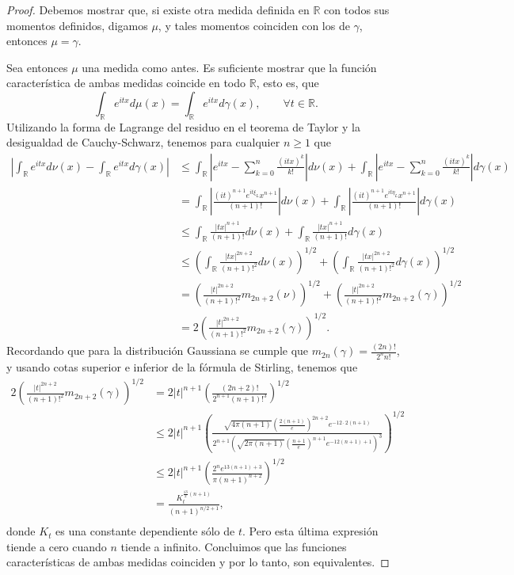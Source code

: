 \documentclass[letterpaper,twoside,12pt]{book}
\newcommand{\R}{\mathbb{R}}
\newcommand{\1}{\mathds{1}}
\newcommand{\abs}[1]{\left\lvert #1 \right\rvert}
\theoremstyle{definition}
\theoremstyle{definition}
\theoremstyle{remark}
\theoremstyle{definition}
\theoremstyle{definition}
\theoremstyle{definition}
\theoremstyle{definition}
\theoremstyle{definition}
\begin{document}
 \begin{proof} 
    Debemos mostrar que, si existe otra medida definida en $\R$ con todos sus momentos definidos, digamos $\mu$, y  tales momentos coinciden con los de $\gamma$, entonces $\mu=\gamma$.

    Sea entonces $\mu$ una medida como antes. Es suficiente mostrar que la función característica de ambas medidas coincide en todo $\R$, esto es, que 
    \[
      \int_\R e^{itx}d\mu(x)=\int_\R e^{itx}d\gamma(x), \qquad \forall t\in \R.
    \]
    Utilizando la forma de Lagrange del residuo en el teorema de Taylor y la desigualdad de Cauchy-Schwarz, tenemos para cualquier $n\geq1$ que
    \begin{align*}
      \abs{\int_{\R}e^{itx}d\nu(x)-\int_\R e^{itx}d\gamma(x)}&\leq \int_\R \abs{e^{itx}-\sum_{k=0}^{n}\frac{(itx)^k}{k!}}d\nu(x)+\int_\R \abs{e^{itx}-\sum_{k=0}^{n}\frac{(itx)^k}{k!}}d\gamma(x)\\
      &=\int_\R \abs{\frac{(it)^{n+1}e^{it\xi_L}x^{n+1}}{(n+1)!}}d\nu(x)+\int_\R \abs{\frac{(it)^{n+1}e^{it\eta_L}x^{n+1}}{(n+1)!}}d\gamma(x)\\
      &\leq\int_\R \frac{\abs{tx}^{n+1}}{(n+1)!}d\nu(x)+\int_\R \frac{\abs{tx}^{n+1}}{(n+1)!}d\gamma(x)\\
      &\leq \left(\int_{\R}\frac{\abs{tx}^{2n+2}}{(n+1)!^2}d\nu(x)\right)^{1/2}+\left(\int_{\R}\frac{\abs{tx}^{2n+2}}{(n+1)!^2}d\gamma(x)\right)^{1/2}\\
      &=\left(\frac{\abs{t}^{2n+2}}{(n+1)!^2}m_{2n+2}(\nu)\right)^{1/2}+\left(\frac{\abs{t}^{2n+2}}{(n+1)!^2}m_{2n+2}(\gamma)\right)^{1/2}\\
      &=2\left(\frac{\abs{t}^{2n+2}}{(n+1)!^2}m_{2n+2}(\gamma)\right)^{1/2}.
    \end{align*}
   Recordando que para la distribución Gaussiana se cumple que $m_{2n}(\gamma)=\frac{(2n)!}{2^{n}n!}$, y usando cotas superior e inferior de la fórmula de Stirling, tenemos que 
   \begin{align*}
      2\left(\frac{\abs{t}^{2n+2}}{(n+1)!^2}m_{2n+2}(\gamma)\right)^{1/2}&=2|t|^{n+1}\left(\frac{(2n+2)!}{2^{n+1}(n+1)!^3}\right)^{1/2}\\
      &\leq 2|t|^{n+1}\left(\frac{\sqrt{4\pi(n+1)}\left(\tfrac{2(n+1)}{e}\right)^{2n+2}e^{-12\cdot 2(n+1)}}{2^{n+1}\left(\sqrt{2\pi(n+1)}\left(\tfrac{n+1}{e}\right)^{n+1}e^{-12(n+1)+1}\right)^{3}}\right)^{1/2}\\
      &\leq 2|t|^{n+1}\left(\frac{2^ne^{13(n+1)+3}}{\pi(n+1)^{n+2}}\right)^{1/2}\\
      &=\frac{K_t^{\tfrac{13}{2}(n+1)}}{(n+1)^{n/2+1}},\\
   \end{align*} 
   donde $K_t$ es una constante dependiente sólo de $t$. Pero esta última expresión tiende a cero cuando $n$ tiende a infinito. Concluimos que las funciones características de ambas medidas coinciden y por lo tanto, son equivalentes.
  \end{proof}
\end{document}
